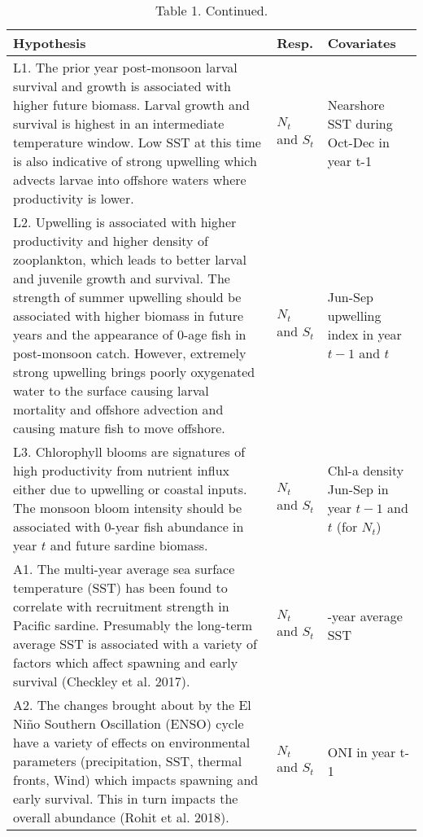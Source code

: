 \begin{table}[t]

\caption{\label{tab:unnamed-chunk-3}Table 1. Continued.}
\centering
\begin{tabular}{>{\raggedright\arraybackslash}p{10.5cm}|>{\raggedright\arraybackslash}p{1cm}|>{\raggedright\arraybackslash}p{3cm}}
\hline
Hypothesis & Resp. & Covariates\\
\hline
L1.  The prior year post-monsoon larval survival and growth is associated with higher future biomass. Larval growth and survival is highest in an intermediate temperature window. Low SST at this time is also indicative of strong upwelling which advects larvae into offshore waters where productivity is lower. & $N_t$ and $S_t$ & Nearshore SST during Oct-Dec in year t-1\\
\hline
L2. Upwelling is associated with higher productivity and higher density of zooplankton, which leads to better larval and juvenile growth and survival.  The strength of summer upwelling should be associated with higher biomass in future years and the appearance of 0-age fish in post-monsoon catch. However, extremely strong upwelling brings poorly oxygenated water to the surface causing larval mortality and offshore advection and causing mature fish to move offshore. & $N_t$ and $S_t$ & Jun-Sep upwelling index in year $t-1$ and $t$\\
\hline
L3. Chlorophyll blooms are signatures of high productivity from nutrient influx either due to upwelling or coastal inputs.  The monsoon bloom intensity should be associated with 0-year fish abundance in year $t$ and future sardine biomass. & $N_t$ and $S_t$ & Chl-a density Jun-Sep in year $t-1$ and $t$ (for $N_t$)\\
\hline
A1. The multi-year average sea surface temperature (SST) has been found to correlate with recruitment strength in Pacific sardine. Presumably the long-term average SST is associated with a variety of factors which affect spawning and early survival (Checkley et al. 2017). & $N_t$ and $S_t$ & 3-year average SST\\
\hline
A2. The changes brought about by the El Niño Southern Oscillation (ENSO) cycle have a variety of effects on environmental parameters (precipitation, SST, thermal fronts, Wind) which impacts spawning and early survival. This in turn impacts the overall abundance (Rohit et al. 2018). & $N_t$ and $S_t$ & ONI in year t-1\\
\hline
\end{tabular}
\end{table}


